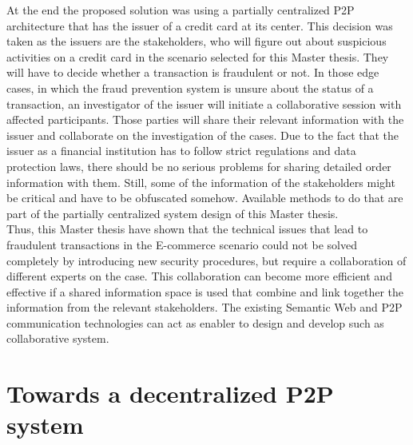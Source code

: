 At the end the proposed solution was using a partially centralized \gls{P2P} architecture that has the issuer of a credit card at its center. This decision was taken as the issuers are the stakeholders, who will figure out about suspicious activities on a credit card in the scenario selected for this Master thesis. They will have to decide whether a transaction is fraudulent or not. In those edge cases, in which the fraud prevention system is unsure about the status of a transaction, an investigator of the issuer will initiate a collaborative session with affected participants. Those parties will share their relevant information with the issuer and collaborate on the investigation of the cases. Due to the fact that the issuer as a financial institution has to follow strict regulations and data protection laws, there should be no serious problems for sharing detailed order information with them. Still, some of the information of the stakeholders might be critical and have to be obfuscated somehow. Available methods to do that are part of the partially centralized system design of this Master thesis. \\

Thus, this Master thesis have shown that the technical issues that lead to fraudulent transactions in the \gls{E-commerce} scenario could not be solved completely by introducing new security procedures, but require a collaboration of different experts on the case. This collaboration can become more efficient and effective if a shared information space is used that combine and link together the information from the relevant stakeholders. The existing Semantic Web and \gls{P2P} communication technologies can act as enabler to design and develop such as collaborative system.

\section{Towards a decentralized \gls{P2P} system}
\label{sec:p2p_decentralized_system}

